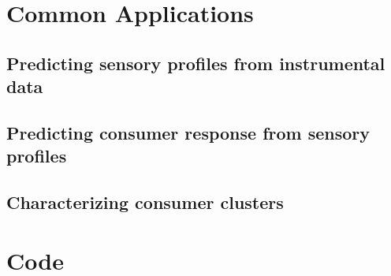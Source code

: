 \documentclass[
]{book}
\begin{document}
\hypertarget{common-applications}{%
\section{Common Applications}\label{common-applications}}

\hypertarget{predicting-sensory-profiles-from-instrumental-data}{%
\subsection{Predicting sensory profiles from instrumental data}\label{predicting-sensory-profiles-from-instrumental-data}}

\hypertarget{predicting-consumer-response-from-sensory-profiles}{%
\subsection{Predicting consumer response from sensory profiles}\label{predicting-consumer-response-from-sensory-profiles}}

\hypertarget{characterizing-consumer-clusters}{%
\subsection{Characterizing consumer clusters}\label{characterizing-consumer-clusters}}

\hypertarget{code}{%
\section{Code}\label{code}}
\end{document}

